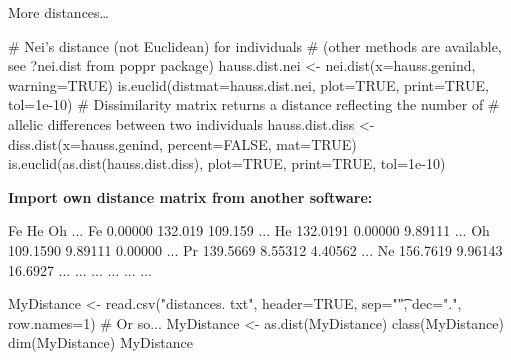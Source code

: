 \documentclass[compress, xelatex, 11pt, xcolor=svgnames, aspectratio=169,
	hyperref={
		bookmarks=true,
		unicode=true,
		colorlinks=true,
		pdftitle={Molecular data in R},
		plainpages=false,
		pdfauthor={Vojtech Zeisek},
		pdfsubject={Course about phylogeny and evolution in R},
		pdfcreator={XeLaTeX},
		pdfkeywords={R, evolution, phylogeny, molecular data},
		linkcolor=Crimson, %
		anchorcolor=Magenta, %
		citecolor=Magenta, %
		filecolor=Magenta, %
		menucolor=Magenta, %
		urlcolor=DodgerBlue, %
		},
	url={hyphens, lowtilde} %
	]{beamer}
\begin{document}
\begin{frame}[fragile]{More distances\ldots}
	\begin{spluscode}
    # Nei's distance (not Euclidean) for individuals
    # (other methods are available, see ?nei.dist from poppr package)
    hauss.dist.nei <- nei.dist(x=hauss.genind, warning=TRUE)
    is.euclid(distmat=hauss.dist.nei, plot=TRUE, print=TRUE, tol=1e-10)
    # Dissimilarity matrix returns a distance reflecting the number of
    # allelic differences between two individuals
    hauss.dist.diss <- diss.dist(x=hauss.genind, percent=FALSE, mat=TRUE)
    is.euclid(as.dist(hauss.dist.diss), plot=TRUE, print=TRUE, tol=1e-10)
	\end{spluscode}
	\vfill
	\textbf{Import own distance matrix from another software:}
	\begin{multicols}{2}
		\begin{spluscode}
       Fe       He      Oh      ...
    Fe 0.00000  132.019 109.159 ...
    He 132.0191 0.00000 9.89111 ...
    Oh 109.1590 9.89111 0.00000 ...
    Pr 139.5669 8.55312 4.40562 ...
    Ne 156.7619 9.96143 16.6927 ...
    ... ...     ...     ...     ...
		\end{spluscode}
		\columnbreak
		\begin{spluscode}
    MyDistance <- read.csv("distances.
      txt", header=TRUE, sep="\t",
      dec=".", row.names=1) # Or so...
    MyDistance <- as.dist(MyDistance)
    class(MyDistance)
    dim(MyDistance)
    MyDistance
		\end{spluscode}
	\end{multicols}
\end{frame}
\end{document}
